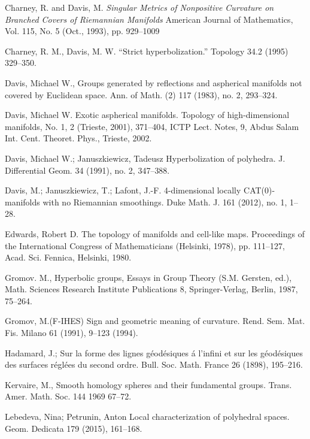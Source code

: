 \begin{thebibliography}{52}
Charney, R. and  Davis, M.
\textit{Singular Metrics of Nonpositive Curvature on Branched Covers of Riemannian Manifolds}
American Journal of Mathematics, Vol. 115, No. 5 (Oct., 1993), pp. 929--1009

Charney, R. M., Davis, M. W. 
``Strict hyperbolization.'' Topology 34.2 (1995) 329--350.

Davis, Michael W., Groups generated by reflections and aspherical manifolds not covered by Euclidean space.
Ann. of Math. (2) 117 (1983), no. 2, 293--324. 

 Davis, Michael W. Exotic aspherical manifolds. Topology of high-dimensional manifolds, No. 1, 2 (Trieste, 2001), 371--404, ICTP Lect. Notes, 9, Abdus Salam Int. Cent. Theoret. Phys., Trieste, 2002.



 Davis, Michael W.; Januszkiewicz, Tadeusz Hyperbolization of polyhedra. J. Differential Geom. 34 (1991), no. 2, 347--388.

Davis, M.; 
Januszkiewicz, T.; 
Lafont, J.-F.
4-dimensional locally CAT(0)-manifolds with no Riemannian smoothings. 
Duke Math. J. 161 (2012), no. 1, 1--28.

 Edwards, Robert D. The topology of manifolds and cell-like maps. Proceedings of the International Congress of Mathematicians (Helsinki, 1978), pp. 111--127, Acad. Sci. Fennica, Helsinki, 1980.

Gromov. M.,
Hyperbolic groups, 
Essays in Group Theory (S.M. Gersten, ed.),
Math. Sciences Research Institute Publications 8,
Springer-Verlag, Berlin,
1987, 75--264.

Gromov, M.(F-IHES)
Sign and geometric meaning of curvature. 
Rend. Sem. Mat. Fis. Milano 61 (1991), 9--123 (1994).

 Hadamard, J.;
Sur la forme des lignes g\'eod\'esiques \'a l'infini et sur les g\'eod\'esiques des surfaces r\'egl\'ees du second ordre.
Bull. Soc. Math. France 26 (1898), 195--216.

 Kervaire, M., 
Smooth homology spheres and their fundamental groups.
Trans. Amer. Math. Soc. 144 1969 67--72.

 Lebedeva, Nina; Petrunin, Anton Local characterization of polyhedral spaces. Geom. Dedicata 179 (2015), 161--168.


\end{thebibliography}
